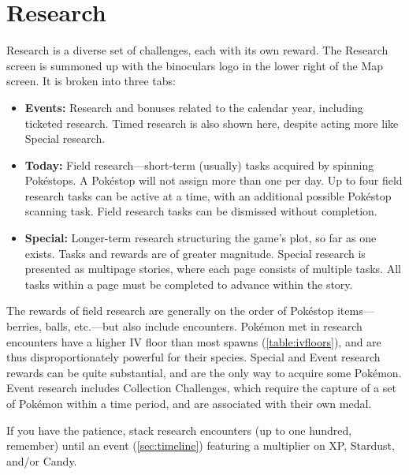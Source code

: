 %

\section{Research\label{sec:research}}
Research is a diverse set of challenges, each with its own reward.
The Research screen is summoned up with the binoculars logo in the lower right of the Map screen.
It is broken into three tabs:
\begin{itemize}
  \item \textbf{Events:} Research and bonuses related to the calendar year, including ticketed research.
    Timed research is also shown here, despite acting more like Special research.
  \item \textbf{Today:} Field research---short-term (usually) tasks acquired by spinning Pokéstops.
    A Pokéstop will not assign more than one per day.
    Up to four field research tasks can be active at a time, with an additional possible
     Pokéstop scanning task.
    Field research tasks can be dismissed without completion.
  \item \textbf{Special:} Longer-term research structuring the game's plot, so far as one exists.%
    Tasks and rewards are of greater magnitude.
    Special research is presented as multipage stories, where each page consists of multiple tasks.
    All tasks within a page must be completed to advance within the story.
\end{itemize}
The rewards of field research are generally on the order of Pokéstop items---berries, balls,
 etc.---but also include encounters.
Pokémon met in research encounters have a higher IV floor than most spawns (\autoref{table:ivfloors}),
  and are thus disproportionately powerful for their species.
Special and Event research rewards can be quite substantial, and are the only way to acquire some Pokémon.
Event research includes Collection Challenges, which require the capture of a set of Pokémon
  within a time period, and are associated with their own medal.
\begin{tipbox}[title=Maximizing the value of research encounters]
If you have the patience, stack research encounters (up to one hundred, remember) until
an event (\autoref{sec:timeline}) featuring a multiplier on XP, Stardust, and/or Candy.
\end{tipbox}
%

